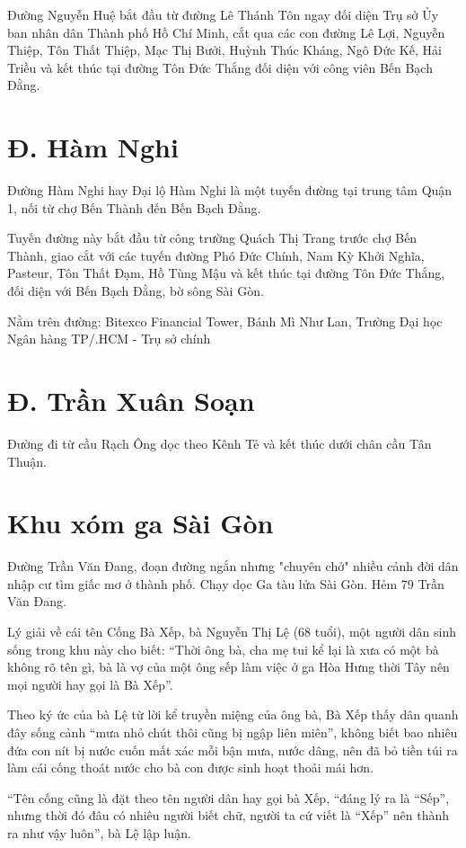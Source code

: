 Đường Nguyễn Huệ bắt đầu từ đường Lê Thánh Tôn ngay đối diện Trụ sở Ủy ban nhân dân Thành phố Hồ Chí Minh, cắt qua các con đường Lê Lợi, Nguyễn Thiệp, Tôn Thất Thiệp, Mạc Thị Bưởi, Huỳnh Thúc Kháng, Ngô Đức Kế, Hải Triều và kết thúc tại đường Tôn Đức Thắng đối diện với công viên Bến Bạch Đằng.

\section{Đ. Hàm Nghi}

Đường Hàm Nghi hay Đại lộ Hàm Nghi là một tuyến đường tại trung tâm Quận 1, nối từ chợ Bến Thành đến Bến Bạch Đằng.

Tuyến đường này bắt đầu từ công trường Quách Thị Trang trước chợ Bến Thành, giao cắt với các tuyến đường Phó Đức Chính, Nam Kỳ Khởi Nghĩa, Pasteur, Tôn Thất Đạm, Hồ Tùng Mậu và kết thúc tại đường Tôn Đức Thắng, đối diện với Bến Bạch Đằng, bờ sông Sài Gòn.

Nằm trên đường: Bitexco Financial Tower, Bánh Mì Như Lan, Trường Đại học Ngân hàng TP/.HCM - Trụ sở chính

\section{Đ. Trần Xuân Soạn}

Đường đi từ cầu Rạch Ông dọc theo Kênh Tẻ và kết thúc dưới chân cầu Tân Thuận.

\section{Khu xóm ga Sài Gòn}

Đường Trần Văn Đang, đoạn đường ngắn nhưng "chuyên chở" nhiều cảnh đời dân nhập cư tìm giấc mơ ở thành phố. Chạy dọc Ga tàu lửa Sài Gòn. Hẻm 79 Trần Văn Đang.

Lý giải về cái tên Cống Bà Xếp, bà Nguyễn Thị Lệ (68 tuổi), một người dân sinh sống trong khu này cho biết: “Thời ông bà, cha mẹ tui kể lại là xưa có một bà không rõ tên gì, bà là vợ của một ông sếp làm việc ở ga Hòa Hưng thời Tây nên mọi người hay gọi là Bà Xếp”.

Theo ký ức của bà Lệ từ lời kể truyền miệng của ông bà, Bà Xếp thấy dân quanh đây sống cảnh “mưa nhỏ chút thôi cũng bị ngập liên miên”, không biết bao nhiêu đứa con nít bị nước cuốn mất xác mỗi bận mưa, nước dâng, nên đã bỏ tiền túi ra làm cái cống thoát nước cho bà con được sinh hoạt thoải mái hơn.

“Tên cống cũng là đặt theo tên người dân hay gọi bà Xếp, “đáng lý ra là “Sếp”, nhưng thời đó đâu có nhiêu người biết chữ, người ta cứ viết là “Xếp” nên thành ra như vậy luôn”, bà Lệ lập luận.

